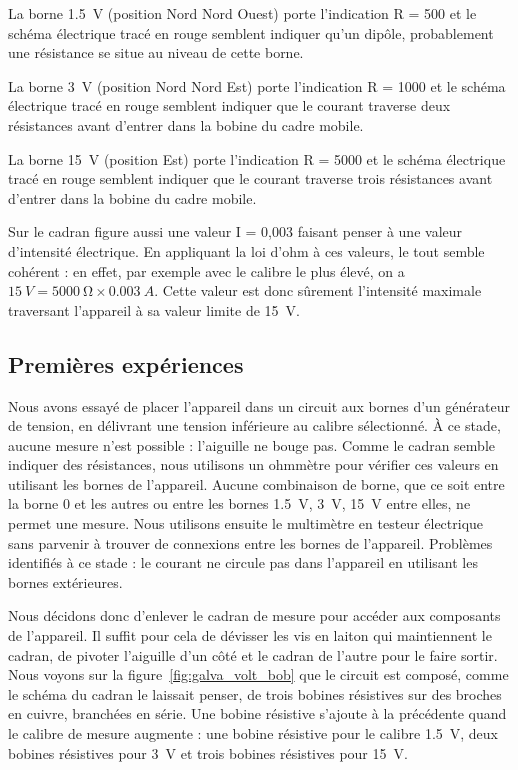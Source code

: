 \documentclass[12pt,a4paper,fleqn]{article}
\begin{document}
La borne \SI{1.5}{V} (position Nord Nord Ouest) porte l'indication \og R = 500 \fg{} et le schéma électrique tracé en rouge semblent indiquer qu'un dipôle, probablement une résistance se situe au niveau de cette borne.

La borne \SI{3}{V} (position Nord Nord Est) porte l'indication \og R = 1000 \fg{} et le schéma électrique tracé en rouge semblent indiquer que le courant traverse deux résistances avant d'entrer dans la bobine du cadre mobile.

La borne \SI{15}{V} (position Est) porte l'indication \og R = 5000 \fg{} et le schéma électrique tracé en rouge semblent indiquer que le courant traverse trois résistances avant d'entrer dans la bobine du cadre mobile.

Sur le cadran figure aussi une valeur \og I = 0{,}003 \fg{} faisant penser à une valeur d'intensité électrique.
En appliquant la loi d'ohm à ces valeurs, le tout semble cohérent : en effet, par exemple avec le calibre le plus élevé, on a $ \SI{15}{V} = \SI{5000}{\ohm} \times \SI{0.003}{A}$.
Cette valeur est donc sûrement l'intensité maximale traversant l'appareil à sa valeur limite de \SI{15}{V}.

\subsection{Premières expériences}

Nous avons essayé de placer l'appareil dans un circuit aux bornes d'un générateur de tension, en délivrant une tension inférieure au calibre sélectionné.
À ce stade, aucune mesure n'est possible : l'aiguille ne bouge pas.
Comme le cadran semble indiquer des résistances, nous utilisons un ohmmètre pour vérifier ces valeurs en utilisant les bornes de l'appareil.
Aucune combinaison de borne, que ce soit entre la borne 0 et les autres ou entre les bornes \SI{1.5}{V}, \SI{3}{V}, \SI{15}{V} entre elles, ne permet une mesure.
Nous utilisons ensuite le multimètre en testeur électrique sans parvenir à trouver de connexions entre les bornes de l'appareil.
Problèmes identifiés à ce stade : le courant ne circule pas dans l'appareil en utilisant les bornes extérieures.

Nous décidons donc d'enlever le cadran de mesure pour accéder aux composants de l'appareil. Il suffit pour cela de dévisser les vis en laiton qui maintiennent le cadran, de pivoter l'aiguille d'un côté et le cadran de l'autre pour le faire sortir.
Nous voyons sur la figure~\ref{fig:galva_volt_bob} que le circuit est composé, comme le schéma du cadran le laissait penser, de trois bobines résistives sur des broches en cuivre, branchées en série.
Une bobine résistive s'ajoute à la précédente quand le calibre de mesure augmente : une bobine résistive pour le calibre \SI{1.5}{V}, deux bobines résistives pour \SI{3}{V} et trois bobines résistives pour \SI{15}{V}.
\end{document}
